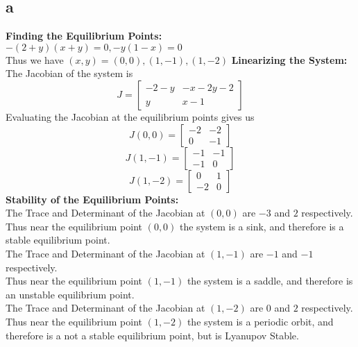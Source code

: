 \documentclass{article}
\begin{document}
\subsection*{a}
\textbf{Finding the Equilibrium Points:}\\
$-(2+y)(x+y) = 0, -y(1-x)=0$\\
Thus we have $(x,y) = (0,0), (1,-1), (1,-2)$
\textbf{Linearizing the System:}\\
The Jacobian of the system is
$$J = \begin{bmatrix}
    -2-y & -x-2y-2\\
    y & x-1
\end{bmatrix}$$
Evaluating the Jacobian at the equilibrium points gives us
$$J(0,0) = \begin{bmatrix}
    -2 & -2\\
    0 & -1
\end{bmatrix}$$
$$J(1,-1) = \begin{bmatrix}
    -1 & -1\\
    -1 & 0
\end{bmatrix}$$
$$J(1,-2) = \begin{bmatrix}
    0 & 1\\
    -2 & 0
\end{bmatrix}$$
\textbf{Stability of the Equilibrium Points:}\\
The Trace and Determinant of the Jacobian at $(0,0)$ are $-3$ and $2$ respectively.\\
Thus near the equilibrium point $(0,0)$ the system is a sink, and therefore is a stable equilibrium point.\\
The Trace and Determinant of the Jacobian at $(1,-1)$ are $-1$ and $-1$ respectively.\\
Thus near the equilibrium point $(1,-1)$ the system is a saddle, and therefore is an unstable equilibrium point.\\
The Trace and Determinant of the Jacobian at $(1,-2)$ are $0$ and $2$ respectively.\\
Thus near the equilibrium point $(1,-2)$ the system is a periodic orbit, and therefore is a not a stable equilibrium point, but is Lyanupov Stable.\\
\end{document}
